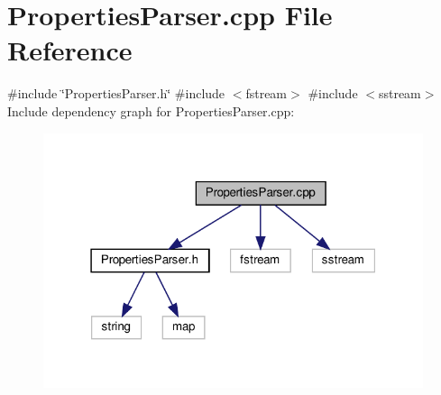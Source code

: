 \section{Properties\+Parser.\+cpp File Reference}
\label{_properties_parser_8cpp}
{\ttfamily \#include \char`\"{}Properties\+Parser.\+h\char`\"{}}\newline
{\ttfamily \#include $<$fstream$>$}\newline
{\ttfamily \#include $<$sstream$>$}\newline
Include dependency graph for Properties\+Parser.\+cpp\+:
\nopagebreak
\begin{figure}[H]
\begin{center}
\leavevmode
\includegraphics[width=316pt]{_properties_parser_8cpp__incl}
\end{center}
\end{figure}
